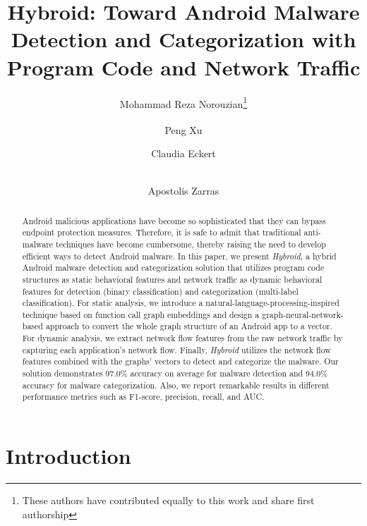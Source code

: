 \documentclass[runningheads]{llncs}
\makeatletter
\newcommand{\toolname}{\textit{Hybroid}\xspace}
\newcommand{\printfnsymbol}[1]{%
  \textsuperscript{\@fnsymbol{#1}}%
}
\makeatother
\begin{document}
\title{Hybroid: Toward Android Malware Detection and Categorization with Program Code and Network Traffic}

\author{
Mohammad Reza Norouzian\thanks{These authors have contributed equally to this work and share first authorship}\and
Peng Xu\printfnsymbol{1}\and
Claudia Eckert\and \\
Apostolis Zarras
}


\maketitle

\begin{abstract}

Android malicious applications have become so sophisticated that they can bypass endpoint protection measures. Therefore, it is safe to admit that traditional anti-malware techniques have become cumbersome, thereby raising the need to develop efficient ways to detect Android malware. In this paper, we present \toolname, a hybrid Android malware detection and categorization solution that utilizes program code structures as static behavioral features and network traffic as dynamic behavioral features for detection (binary classification) and categorization (multi-label classification). For static analysis, we introduce a natural-language-processing-inspired technique based on function call graph embeddings and design a graph-neural-network-based approach to convert the whole graph structure of an Android app to a vector. For dynamic analysis, we extract network flow features from the raw network traffic by capturing each application's network flow. Finally, \toolname utilizes the network flow features combined with the graphs' vectors to detect and categorize the malware. Our solution demonstrates 97.0\% accuracy on average for malware detection and 94.0\% accuracy for malware categorization. Also, we report remarkable results in different performance metrics such as F1-score, precision, recall, and AUC.
	
\end{abstract}

\setcounter{footnote}{0}


\section{Introduction}
\end{document}
